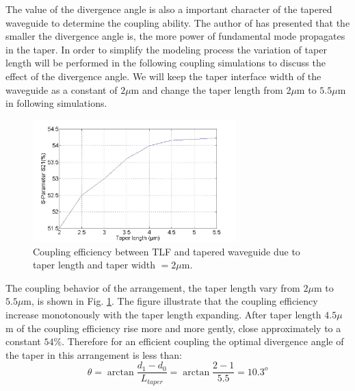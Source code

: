 The value of the divergence angle is also a important character of the tapered waveguide to determine the coupling ability. The author of \cite{study_linear_tapered_waveguides} has presented that the smaller the divergence angle is, the more power of fundamental mode propagates in the taper. In order to simplify the modeling process the variation of taper length will be performed in the following coupling simulations to discuss the effect of the divergence angle.
We will keep the taper interface width of the waveguide as a constant of $2\mu$m and change the taper length from $2\mu$m to $5.5\mu$m in following simulations.\\
  
\begin{figure}[!ht]
\centering
\includegraphics[width=0.7\textwidth]{bilder/tapered_waveguide_dxx}
\caption{Coupling efficiency between TLF and tapered waveguide due to taper length and taper width $= 2\mu$m.}
\label{fig:tapered_waveguide_dxx}
\end{figure}
The coupling behavior of the arrangement, the taper length vary from $2\mu$m to $5.5\mu$m, is shown in Fig. \ref{fig:tapered_waveguide_dxx}.  The figure illustrate that the coupling efficiency increase monotonously with the taper length expanding. After taper length $4.5\mu$m of the coupling efficiency rise more and more gently, close approximately to a constant $54\%$. 
Therefore for an efficient coupling the optimal divergence angle of the taper in this arrangement is less than:
\begin{equation}
\theta=\arctan\frac{d_{1}-d_{0}}{L_{taper}}=\arctan\frac{2-1}{5.5}=10.3^{o}
\label{eq:divergence_angle}
\end{equation}
